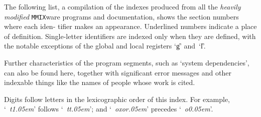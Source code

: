 \def\copyxTeX{\\{copy\_\TEX/}}
\def\skipxTeX{\\{skip\_\TEX/}}
\def\TeXxstring{\\{\TEX/\_string}}

\def\ff{\\{ff\kern-.05em}}

\def\CPV{\\{CPV}}
\def\OP{\\{OP}}
\def\PV{\\{PV}} %

\def\NNIX{\hbox{\mc NNIX}}

\def\\#1{\leavevmode\hbox{\it %
  \def\_{\kern-.08em\hbox{\tt\char`\_}\kern-.08em}%
  #1\/\kern.05em}} %
\def\&#1{\leavevmode\hbox{\bf %
  \def\_{\kern-.05em\hbox{\tt\char`\_}\kern-.05em}%
  #1\/\kern.05em}} %


\newif\iftitle \titletrue
\def\lheader{\vbox to10pt{}\iftitle\global\titlefalse
  \else\nineit\rhead\fi\hfil\eightrm\folio}
\def\rheader{\vbox to10pt{}\eightrm\folio\hfil\nineit\rhead\/}
\def\normaloutput#1{\setbox2=\vbox{
      \vbox to 3pc{
        \hbox to 30.7pc{\ifodd\pageno\lheader\else\rheader\fi}\vfill}
    \nointerlineskip#1}%
  \shipout\box2
  \global\advance\pageno 1 }

\preinx %
\bigskip
\noindent
The following list, a compilation of the indexes produced from all the
{\it heavily modified\/}
{\tt MMIX}ware programs and documentation, shows the section numbers where
each iden- tifier makes an appearance. Underlined numbers indicate a place
of definition. Single-letter identifiers are indexed only when they are
defined, with the notable exceptions of the global and local registers
`\|g' and~`\|l'.

Further characteristics of the program segments, such as `system dependencies',
can also be found here, together with significant error messages and other
indexable things like the names of people whose work is cited.

Digits follow letters in the lexicographic order of this index.
For example, `\\{t1}' follows `\\{tt}';
and `\\{oxor}' precedes `\\{o0}'.
\inx %
